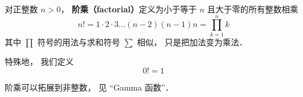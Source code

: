 
\begin{issues}
\issueDraft
\end{issues}

对正整数 $n > 0$， \textbf{阶乘（factorial）}定义为小于等于 $n$ 且大于零的所有整数相乘
\begin{equation}
n! = 1 \cdot 2 \cdot 3 \dots (n - 2) (n - 1)n = \prod_{k = 1}^n k
\end{equation}
其中 $\prod$ 符号的用法与求和符号 $\sum$ 相似， 只是把加法变为乘法． %

特殊地， 我们定义
\begin{equation}
0! = 1
\end{equation}

阶乘可以拓展到非整数， 见 “Gamma 函数”．
